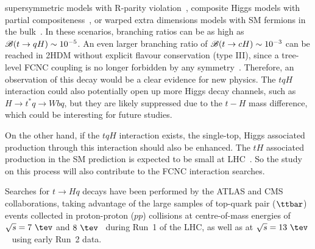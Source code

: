 supersymmetric models with R-parity violation~\cite{Eilam:2001dh}, composite Higgs models with partial compositeness~\cite{Azatov:2014lha}, 
or warped extra dimensions models with SM fermions in the bulk~\cite{Azatov:2009na}. 
In these scenarios, branching ratios can be as high as $\mathscr{B}(t\to qH) \sim 10^{-5}$. 
An even larger branching ratio of  $\mathscr{B}(t\to cH) \sim 10^{-3}$ can be reached in 2HDM without explicit flavour conservation (type III),
since a tree-level FCNC coupling is no longer forbidden by any symmetry~\cite{Cheng:1987rs,Baum:2008qm,Chen:2013qta,Chiang:2015cba,Crivellin:2015hha,Botella:2015hoa, Gori:2017tvg,Chiang:2017fjr}. 
Therefore, an observation of this decay would be a clear evidence for new physics. The $tqH$ interaction could also potentially open up more
Higgs decay channels, such as $H\rightarrow t^*q\rightarrow Wbq$, but they are likely suppressed due to the $t-H$ mass difference,
which could be interesting for future studies.

On the other hand, if the $tqH$ interaction exists, the single-top, Higgs associated production through this interaction should also be enhanced.
The $tH$ associated production in the SM prediction is expected to be small at LHC~\cite{Greljo:2014dka}.
So the study on this process will also contribute to the FCNC interaction searches.

Searches for $t \to Hq$ decays have been performed by the ATLAS and CMS collaborations, taking advantage of the large samples
of top-quark pair ($\ttbar$) events collected in proton-proton ($pp$) collisions at centre-of-mass energies of $\sqrt{s}=7~\tev$ and $8~\tev$~\cite{Aad:2014dya,Aad:2015pja,Khachatryan:2016atv} during Run~1 of the LHC, as well as at $\sqrt{s}=13~\tev$~\cite{fcnc36} using early Run~2 data.

